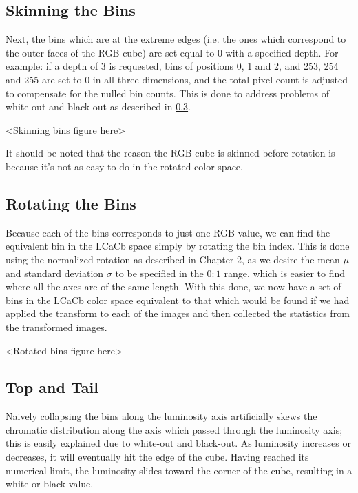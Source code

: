 \subsection{Skinning the Bins}\label{sec:SkinningTheBins}
Next, the bins which are at the extreme edges (i.e. the ones which correspond to the outer faces of the RGB cube) are set equal to 0 with a specified depth. For example: if a depth of 3 is requested, bins of positions 0, 1 and 2, and 253, 254 and 255 are set to 0 in all three dimensions, and the total pixel count is adjusted to compensate for the nulled bin counts. This is done to address problems of white-out and black-out as described in \ref{sec:TopAndTail}.

<Skinning bins figure here>

It should be noted that the reason the RGB cube is skinned before rotation is because it's not as easy to do in the rotated color space.


\subsection{Rotating the Bins}\label{sec:RotatingTheBins}
Because each of the bins corresponds to just one RGB value, we can find the equivalent bin in the LCaCb space simply by rotating the bin index. This is done using the normalized rotation as described in Chapter 2, as we desire the mean $\mu$ and standard deviation $\sigma$ to be specified in the $0:1$ range, which is easier to find where all the axes are of the same length. With this done, we now have a set of bins in the LCaCb color space equivalent to that which would be found if we had applied the transform to each of the images and then collected the statistics from the transformed images.

<Rotated bins figure here>


\subsection{Top and Tail}\label{sec:TopAndTail}

Naively collapsing the bins along the luminosity axis artificially skews the chromatic distribution along the axis which passed through the luminosity axis; this is easily explained due to white-out and black-out. As luminosity increases or decreases, it will eventually hit the edge of the cube. Having reached its numerical limit, the luminosity slides toward the corner of the cube, resulting in a white or black value.

